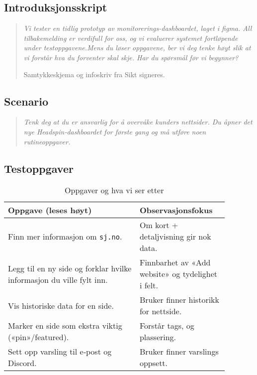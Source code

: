 \subsection*{Introduksjonsskript}
\begin{quote}\itshape
Vi tester en tidlig prototyp av monitorerings-dashboardet, laget i figma. All tilbakemelding er verdifull for oss, og vi evaluerer systemet fortløpende under testoppgavene.Mens du løser oppgavene, ber vi deg tenke høyt slik at vi forstår hva du forventer skal skje. Har du spørsmål før vi begynner?


Samtykkeskjema og infoskriv fra Sikt signeres.
\end{quote}

\subsection*{Scenario}
\begin{quote}\itshape
Tenk deg at du er ansvarlig for å overvåke kunders nettsider.  
Du åpner det nye Headspin‑dashboardet for første gang og må utføre noen rutineoppgaver.
\end{quote}

\subsection*{Testoppgaver}
\begin{table}[H]
\centering
\caption{Oppgaver og hva vi ser etter}
\label{tab:tasks}
\begin{tabular}{|p{0.54\linewidth}|p{0.34\linewidth}|}
\hline
\textbf{Oppgave (leses høyt)} & \textbf{Observasjonsfokus} \\ \hline
Finn mer informasjon om \texttt{sj.no}. & Om kort + detaljvisning gir nok data. \\ \hline
Legg til en ny side og forklar hvilke informasjon du ville fylt inn. & Finnbarhet av «Add website» og tydelighet i felt. \\ \hline
Vis historiske data for en side. & Bruker finner historikk for nettside. \\ \hline
Marker en side som ekstra viktig («pin»/featured). & Forstår tags, og plassering. \\ \hline
Sett opp varsling til e‑post og Discord. & Bruker finner varslings oppsett. \\ \hline
\end{tabular}
\end{table}

